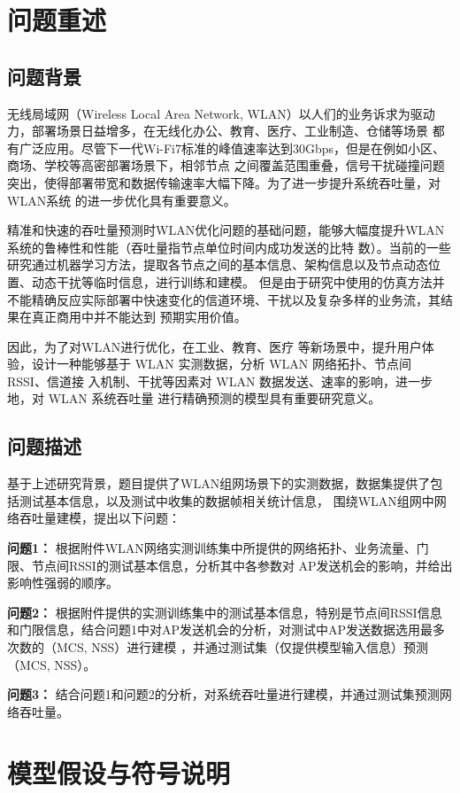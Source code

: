 \documentclass[bwprint]{gmcmthesis}
\begin{document}
\newpage
\section{问题重述}
\subsection{问题背景}
 无线局域网（Wireless Local Area Network, WLAN）以人们的业务诉求为驱动力，部署场景日益增多，在无线化办公、教育、医疗、工业制造、仓储等场景
 都有广泛应用。尽管下一代Wi-Fi7标准的峰值速率达到30Gbps，但是在例如小区、商场、学校等高密部署场景下，相邻节点
 之间覆盖范围重叠，信号干扰碰撞问题突出，使得部署带宽和数据传输速率大幅下降。为了进一步提升系统吞吐量，对WLAN系统
 的进一步优化具有重要意义。

 精准和快速的吞吐量预测时WLAN优化问题的基础问题，能够大幅度提升WLAN系统的鲁棒性和性能（吞吐量指节点单位时间内成功发送的比特
 数）。当前的一些研究通过机器学习方法，提取各节点之间的基本信息、架构信息以及节点动态位置、动态干扰等临时信息，进行训练和建模。
 但是由于研究中使用的仿真方法并不能精确反应实际部署中快速变化的信道环境、干扰以及复杂多样的业务流，其结果在真正商用中并不能达到
 预期实用价值。

 因此，为了对WLAN进行优化，在工业、教育、医疗
 等新场景中，提升用户体验，设计一种能够基于 WLAN 实测数据，分析 WLAN 网络拓扑、节点间 RSSI、信道接
 入机制、干扰等因素对 WLAN 数据发送、速率的影响，进一步地，对 WLAN 系统吞吐量
 进行精确预测的模型具有重要研究意义。
 \subsection{问题描述}
 基于上述研究背景，题目提供了WLAN组网场景下的实测数据，数据集提供了包括测试基本信息，以及测试中收集的数据帧相关统计信息，
 围绕WLAN组网中网络吞吐量建模，提出以下问题：

 \textbf{问题1：}
 根据附件WLAN网络实测训练集中所提供的网络拓扑、业务流量、门限、节点间RSSI的测试基本信息，分析其中各参数对
 AP发送机会的影响，并给出影响性强弱的顺序。

 \textbf{问题2：}
 根据附件提供的实测训练集中的测试基本信息，特别是节点间RSSI信息和门限信息，结合问题1中对AP发送机会的分析，对测试中AP发送数据选用最多次数的（MCS, NSS）进行建模
 ，并通过测试集（仅提供模型输入信息）预测（MCS, NSS）。
 
 \textbf{问题3：}
 结合问题1和问题2的分析，对系统吞吐量进行建模，并通过测试集预测网络吞吐量。

 \newpage
 \section{模型假设与符号说明}
\end{document}
